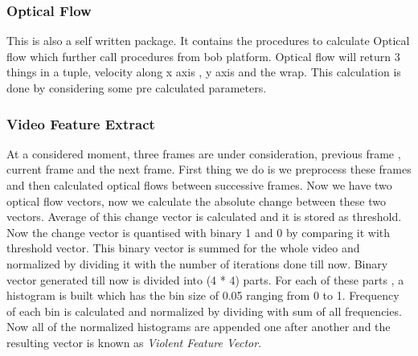 \subsubsection{Optical Flow}
This is also a self written package. It contains the procedures to calculate Optical flow which further call procedures from bob platform. Optical flow will return 3 things in a tuple, velocity along x axis , y axis and the wrap. This calculation is done by considering some pre calculated parameters.
\subsubsection{Video Feature Extract}
At a considered moment, three frames are under consideration, previous frame , current frame and the next frame. First thing we do is we preprocess these frames and then calculated optical flows between successive frames. Now we have two optical flow vectors, now we calculate the absolute change between these two vectors. Average of this change vector is calculated and it is stored as threshold. Now the change vector is quantised with binary 1 and 0 by comparing it with threshold vector. This binary vector is summed for the whole video and normalized by dividing it with the number of iterations done till now. Binary vector generated till now is divided into (4 * 4) parts. For each of these parts , a histogram is built which has the bin size of 0.05 ranging from 0 to 1. Frequency of each bin is calculated and normalized by dividing with sum of all frequencies. Now all of the normalized histograms are appended one after another and the resulting vector is known as \textit{Violent Feature Vector}.